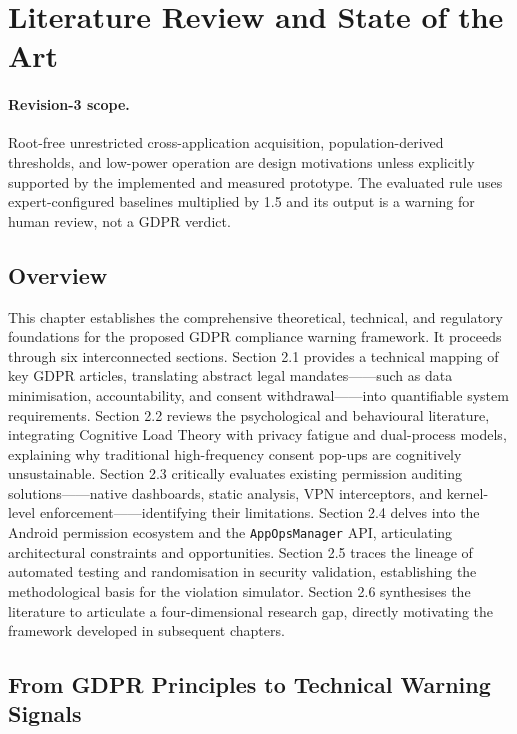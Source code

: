 \newpage
\section{Literature Review and State of the Art}

\paragraph{Revision-3 scope.} Root-free unrestricted cross-application acquisition, population-derived thresholds, and low-power operation are design motivations unless explicitly supported by the implemented and measured prototype. The evaluated rule uses expert-configured baselines multiplied by 1.5 and its output is a warning for human review, not a GDPR verdict.

\subsection{Overview}

This chapter establishes the comprehensive theoretical, technical, and regulatory foundations for the proposed GDPR compliance warning framework. It proceeds through six interconnected sections. Section 2.1 provides a technical mapping of key GDPR articles, translating abstract legal mandates——such as data minimisation, accountability, and consent withdrawal——into quantifiable system requirements. Section 2.2 reviews the psychological and behavioural literature, integrating Cognitive Load Theory with privacy fatigue and dual-process models, explaining why traditional high-frequency consent pop-ups are cognitively unsustainable. Section 2.3 critically evaluates existing permission auditing solutions——native dashboards, static analysis, VPN interceptors, and kernel-level enforcement——identifying their limitations. Section 2.4 delves into the Android permission ecosystem and the \texttt{AppOpsManager} API, articulating architectural constraints and opportunities. Section 2.5 traces the lineage of automated testing and randomisation in security validation, establishing the methodological basis for the violation simulator. Section 2.6 synthesises the literature to articulate a four-dimensional research gap, directly motivating the framework developed in subsequent chapters.

\subsection{From GDPR Principles to Technical Warning Signals}

